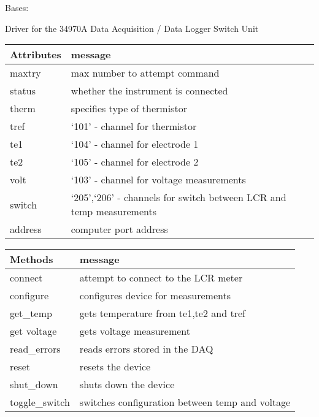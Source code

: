 \documentclass[letterpaper,10pt,english]{sphinxmanual}
\begin{document}
\begin{fulllineitems}
\label{\detokenize{source/laboratory.drivers:laboratory.drivers.daq.DAQ}}
Bases: 

Driver for the 34970A Data Acquisition / Data Logger Switch Unit


\begin{savenotes}\sphinxattablestart
\centering
\begin{tabulary}{\linewidth}[t]{|T|T|}
\hline
\sphinxstyletheadfamily 
Attributes
&\sphinxstyletheadfamily 
message
\\
\hline
maxtry
&
max number to attempt command
\\
\hline
status
&
whether the instrument is connected
\\
\hline
therm
&
specifies type of thermistor
\\
\hline
tref
&
‘101’ - channel for thermistor
\\
\hline
te1
&
‘104’ - channel for electrode 1
\\
\hline
te2
&
‘105’ - channel for electrode 2
\\
\hline
volt
&
‘103’ - channel for voltage measurements
\\
\hline
switch
&
‘205’,‘206’ - channels for switch between LCR and temp measurements
\\
\hline
address
&
computer port address
\\
\hline
\end{tabulary}
\par
\sphinxattableend\end{savenotes}


\begin{savenotes}\sphinxattablestart
\centering
\begin{tabulary}{\linewidth}[t]{|T|T|}
\hline
\sphinxstyletheadfamily 
Methods
&\sphinxstyletheadfamily 
message
\\
\hline
connect
&
attempt to connect to the LCR meter
\\
\hline
configure
&
configures device for measurements
\\
\hline
get\_temp
&
gets temperature from te1,te2 and tref
\\
\hline
get voltage
&
gets voltage measurement
\\
\hline
read\_errors
&
reads errors stored in the DAQ
\\
\hline
reset
&
resets the device
\\
\hline
shut\_down
&
shuts down the device
\\
\hline
toggle\_switch
&
switches configuration between temp and voltage
\\
\hline
\end{tabulary}
\par
\sphinxattableend\end{savenotes}


\end{fulllineitems}
\end{document}
